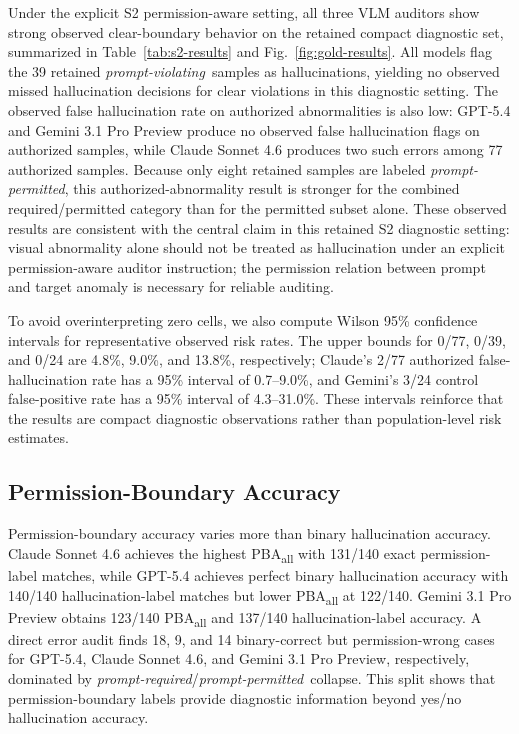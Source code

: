 \documentclass[runningheads]{llncs}
\newcommand{\permrequired}{\emph{prompt-required}}
\newcommand{\permpermitted}{\emph{prompt-permitted}}
\newcommand{\permviolating}{\emph{prompt-violating}}
\begin{document}
Under the explicit S2 permission-aware setting, all three VLM auditors show strong observed clear-boundary behavior on the retained compact diagnostic set, summarized in Table~\ref{tab:s2-results} and Fig.~\ref{fig:gold-results}. All models flag the 39 retained \permviolating\ samples as hallucinations, yielding no observed missed hallucination decisions for clear violations in this diagnostic setting. The observed false hallucination rate on authorized abnormalities is also low: GPT-5.4 and Gemini 3.1 Pro Preview produce no observed false hallucination flags on authorized samples, while Claude Sonnet 4.6 produces two such errors among 77 authorized samples. Because only eight retained samples are labeled \permpermitted, this authorized-abnormality result is stronger for the combined required/permitted category than for the permitted subset alone. These observed results are consistent with the central claim in this retained S2 diagnostic setting: visual abnormality alone should not be treated as hallucination under an explicit permission-aware auditor instruction; the permission relation between prompt and target anomaly is necessary for reliable auditing.

To avoid overinterpreting zero cells, we also compute Wilson 95\% confidence intervals for representative observed risk rates. The upper bounds for 0/77, 0/39, and 0/24 are 4.8\%, 9.0\%, and 13.8\%, respectively; Claude's 2/77 authorized false-hallucination rate has a 95\% interval of 0.7--9.0\%, and Gemini's 3/24 control false-positive rate has a 95\% interval of 4.3--31.0\%. These intervals reinforce that the results are compact diagnostic observations rather than population-level risk estimates.

\subsection{Permission-Boundary Accuracy}

Permission-boundary accuracy varies more than binary hallucination accuracy. Claude Sonnet 4.6 achieves the highest PBA\textsubscript{all} with 131/140 exact permission-label matches, while GPT-5.4 achieves perfect binary hallucination accuracy with 140/140 hallucination-label matches but lower PBA\textsubscript{all} at 122/140. Gemini 3.1 Pro Preview obtains 123/140 PBA\textsubscript{all} and 137/140 hallucination-label accuracy. A direct error audit finds 18, 9, and 14 binary-correct but permission-wrong cases for GPT-5.4, Claude Sonnet 4.6, and Gemini 3.1 Pro Preview, respectively, dominated by \permrequired/\permpermitted\ collapse. This split shows that permission-boundary labels provide diagnostic information beyond yes/no hallucination accuracy.
\end{document}
